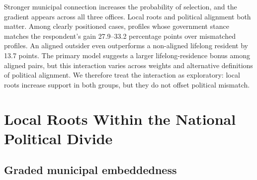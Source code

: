 \documentclass[
  letterpaper,
  DIV=11,
  numbers=noendperiod]{scrartcl}
\newcommand{\criticmarkupadd}[1]{#1}
\newcommand{\criticmarkuprm}[1]{}
\begin{document}
\criticmarkuprm{The three comparisons support one claim: local roots
matter, but they operate within rather than outside the national
political divide. }Stronger municipal
\criticmarkuprm{embeddedness}\criticmarkupadd{connection} increases
\criticmarkupadd{the probability of }selection, and
\criticmarkuprm{this}\criticmarkupadd{the} gradient appears across all
three offices. \criticmarkuprm{Yet aligned}\criticmarkupadd{Local roots
and political alignment both matter. Among clearly positioned cases,}
profiles \criticmarkupadd{whose government stance matches the
respondent's }gain 27.9--33.2 percentage points over
\criticmarkuprm{non-aligned}\criticmarkupadd{mismatched} profiles. An
aligned \criticmarkuprm{profile with the outsider-with-local-knowledge
statement}\criticmarkupadd{outsider} even outperforms a non-aligned
\criticmarkuprm{profile with the lifelong-resident
statement}\criticmarkupadd{lifelong resident} by 13.7 points. The
primary model suggests a larger lifelong-residence bonus among aligned
pairs, but this interaction \criticmarkuprm{weakens under
alternative}\criticmarkupadd{varies across} weights and
\criticmarkuprm{attitude cutoffs.}\criticmarkupadd{alternative
definitions of political alignment. We therefore treat the interaction
as exploratory: local roots increase support in both groups, but they do
not offset political mismatch.}

\criticmarkuprm{The evidence establishes how respondents react to the
randomized statements, not why they value local candidates. Because the
outsider statement also declares local knowledge, the experiment
estimates complete statement contrasts rather than residence alone. It
likewise cannot identify campaign effort, personal acquaintance, or
network mechanisms.}

\section{Local Roots Within the National Political
Divide}\label{local-roots-within-the-national-political-divide}

\subsection{Graded municipal
embeddedness}\label{graded-municipal-embeddedness}
\end{document}
